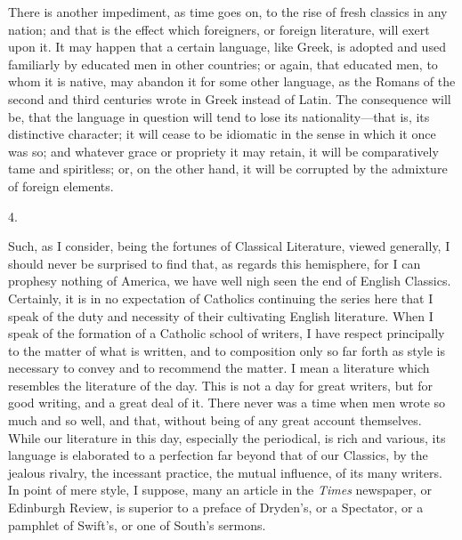 There is another impediment, as time goes on, to the rise of fresh
classics in any nation; and that is the effect which foreigners, or
foreign literature, will exert upon it. It may happen that a certain
language, like Greek, is adopted and used familiarly by educated men
in other countries; or again, that educated men, to whom it is native,
may abandon it for some other language, as the Romans of the second
and third centuries wrote in Greek instead of Latin. The consequence
will be, that the language in question will tend to lose its
nationality—that is, its distinctive character; it will cease to be
idiomatic in the sense in which it once was so; and whatever grace or
propriety it may retain, it will be comparatively tame and spiritless;
or, on the other hand, it will be corrupted by the admixture of
foreign elements.

4.

Such, as I consider, being the fortunes of Classical Literature,
viewed generally, I should never be surprised to find that, as regards
this hemisphere, for I can prophesy nothing of America, we have well
nigh seen the end of English Classics. Certainly, it is in no
expectation of Catholics continuing the series here that I speak of
the duty and necessity of their cultivating English literature. When I
speak of the formation of a Catholic school of writers, I have respect
principally to the matter of what is written, and to composition only
so far forth as style is necessary to convey and to recommend the
matter. I mean a literature which resembles the literature of the day.
This is not a day for great writers, but for good writing, and a great
deal of it. There never was a time when men wrote so much and so well,
and that, without being of any great account themselves. While
our literature in this day, especially the periodical, is rich and
various, its language is elaborated to a perfection far beyond that of
our Classics, by the jealous rivalry, the incessant practice, the
mutual influence, of its many writers. In point of mere style, I
suppose, many an article in the \emph{Times} newspaper, or Edinburgh Review,
is superior to a preface of Dryden's, or a Spectator, or a pamphlet of
Swift's, or one of South's sermons.

